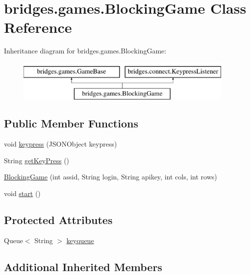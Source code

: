 \hypertarget{classbridges_1_1games_1_1_blocking_game}{}\section{bridges.\+games.\+Blocking\+Game Class Reference}
\label{classbridges_1_1games_1_1_blocking_game}
Inheritance diagram for bridges.\+games.\+Blocking\+Game\+:\begin{figure}[H]
\begin{center}
\leavevmode
\includegraphics[height=2.000000cm]{classbridges_1_1games_1_1_blocking_game}
\end{center}
\end{figure}
\subsection*{Public Member Functions}
\begin{DoxyCompactItemize}
\item 
void \mbox{\hyperlink{classbridges_1_1games_1_1_blocking_game_a53b1b38826785ee7c7a13f486b7b72ba}{keypress}} (J\+S\+O\+N\+Object keypress)
\item 
String \mbox{\hyperlink{classbridges_1_1games_1_1_blocking_game_ac96929a7b516825835d9c9314ed0fdc1}{get\+Key\+Press}} ()
\item 
\mbox{\hyperlink{classbridges_1_1games_1_1_blocking_game_a0ebcf0a4ae8d81173a58d4458a9538cc}{Blocking\+Game}} (int assid, String login, String apikey, int cols, int rows)
\item 
void \mbox{\hyperlink{classbridges_1_1games_1_1_blocking_game_a00f9ad93393ba18407940f24aaddfa21}{start}} ()
\end{DoxyCompactItemize}
\subsection*{Protected Attributes}
\begin{DoxyCompactItemize}
\item 
Queue$<$ String $>$ \mbox{\hyperlink{classbridges_1_1games_1_1_blocking_game_a7a8057fd0e008879f89c86d929cc92e6}{keyqueue}}
\end{DoxyCompactItemize}
\subsection*{Additional Inherited Members}


